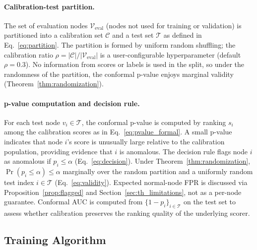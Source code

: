 \documentclass[a4paper]{cas-dc}
\theoremstyle{definition}
\begin{document}
\paragraph{Calibration-test partition.}
The set of evaluation nodes $\mathcal{V}_{\text{eval}}$ (nodes not used for training or validation) is partitioned into a calibration set $\mathcal{C}$ and a test set $\mathcal{T}$ as defined in Eq.~\eqref{eq:partition}.
The partition is formed by uniform random shuffling; the calibration ratio $\rho = |\mathcal{C}| / |\mathcal{V}_{\text{eval}}|$ is a user-configurable hyperparameter (default $\rho = 0.3$). No information from scores or labels is used in the split, so under the randomness of the partition, the conformal p-value enjoys marginal validity (Theorem~\ref{thm:randomization}).

\paragraph{p-value computation and decision rule.}
For each test node $v_i \in \mathcal{T}$, the conformal p-value is computed by ranking $s_i$ among the calibration scores as in Eq.~\eqref{eq:pvalue_formal}.
A small p-value indicates that node $i$'s score is unusually large relative to the calibration population, providing evidence that $i$ is anomalous. The decision rule flags node $i$ as anomalous if $p_i \leq \alpha$ (Eq.~\eqref{eq:decision}).
Under Theorem~\ref{thm:randomization}, $\Pr(p_i \leq \alpha) \leq \alpha$ marginally over the random partition and a uniformly random test index $i \in \mathcal{T}$ (Eq.~\eqref{eq:validity}).  Expected normal-node FPR is discussed via Proposition~\ref{prop:flagged} and Section~\ref{sec:th_limitations}, not as a per-node guarantee.  Conformal AUC is computed from $\{1 - p_i\}_{i \in \mathcal{T}}$ on the test set to assess whether calibration preserves the ranking quality of the underlying scorer.

\subsection{Training Algorithm}
\label{sec:meth_algorithm}
\end{document}
